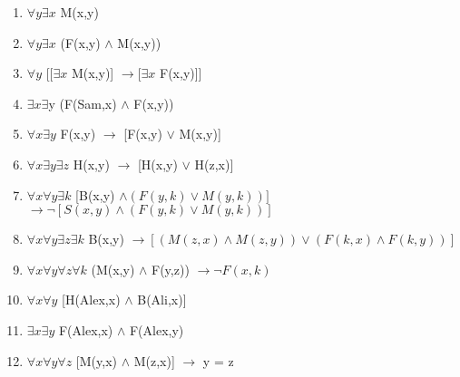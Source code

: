 \documentclass[a4paper,12pt]{article}
\begin{document}
\begin{tcolorbox}

\begin{enumerate}
    \item $\forall y \exists x$ M(x,y) 
    \item $\forall y \exists x$ (F(x,y) $\wedge$ M(x,y))
    \item $\forall y$ [[$\exists x$ M(x,y)] $\rightarrow [ \exists x$  F(x,y)]]
    \item $\exists x \exists$y (F(Sam,x) $\wedge$ F(x,y))
    \item $\forall x \exists y$ F(x,y) $\rightarrow$ [F(x,y) $\vee$ M(x,y)] 
    \item $\forall x \exists y \exists z$ H(x,y) $\rightarrow$ [H(x,y) $\vee$ H(z,x)]
    \item $\forall x \forall y \exists k$  [B(x,y) $\wedge (F(y,k) \vee M(y,k))]$ $\rightarrow \neg [S(x,y) \wedge (F(y,k) \vee M(y,k))]$
    \item $\forall x \forall y \exists z \exists k$ B(x,y) $\rightarrow [(M(z,x) \wedge M(z,y)) \vee (F(k,x) \wedge F(k,y))] $
    \item $\forall x \forall y \forall z \forall k$ (M(x,y) $\wedge$ F(y,z)) $\rightarrow \neg F(x,k)$
    \item $\forall x \forall y$ [H(Alex,x) $\wedge$ B(Ali,x)]
    \item $\exists x \exists y$ F(Alex,x) $\wedge$ F(Alex,y)
    \item $\forall x \forall y \forall z$ [M(y,x) $\wedge$ M(z,x)] $\rightarrow$ y = z
\end{enumerate}
\end{tcolorbox}
\newpage
\end{document}
